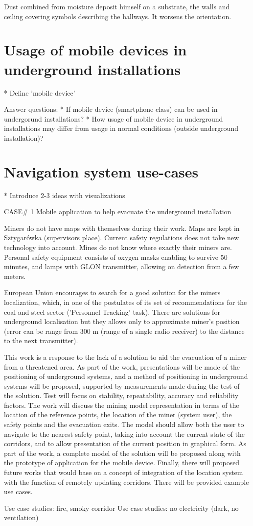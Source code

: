 \documentclass[../main.tex]{subfiles}
\begin{document}
Dust combined from moisture deposit himself on a substrate, the walls and ceiling covering symbols describing the hallways. It worsens the orientation.




\section{Usage of mobile devices in underground installations}
* Define 'mobile device'

Answer questions:
* If mobile device (smartphone class) can be used in undergorund installations?
* How usage of mobile device in underground installations may differ from usage in normal conditions (outside underground installation)?

\section{Navigation system use-cases}
* Introduce 2-3 ideas with visualizations

CASE# 1 Mobile application to help evacuate the underground installation

Miners do not have maps with themselves during their work. Maps are kept in Sztygarówka (supervisors place).
Current safety regulations does not take new technology into account. Mines do not know where exactly their miners are. Personal safety equipment consists of oxygen masks enabling to survive 50 minutes, and lamps with GLON transmitter, allowing on detection from a few meters.

European Union encourages to search for a good solution for the miners localization, which, in one of the postulates of its set of recommendations for the coal and steel sector ('Personnel Tracking' task). There are solutions for underground localisation but they allows only to approximate miner's position (error can be range from 300 m (range of a single radio receiver) to the distance to the next transmitter).

This work is a response to the lack of a solution to aid the evacuation of a miner from a threatened area. As part of the work, presentations will be made of the positioning of underground systems, and a method of positioning in underground systems will be proposed, supported by measurements made during the test of the solution. Test will focus on stability, repeatability, accuracy and reliability factors. The work will discuss the mining model representation in terms of the location of the reference points, the location of the miner (system user), the safety points and the evacuation exits. The model should allow both the user to navigate to the nearest safety point, taking into account the current state of the corridors, and to allow presentation of the current position in graphical form. As part of the work, a complete model of the solution will be proposed along with the prototype of application for the mobile device. Finally, there will proposed future works that would base on a concept of integration of the location system with the function of remotely updating corridors. There will be provided example use cases.

  Use case studies: fire, smoky corridor
  Use case studies: no electricity (dark, no ventilation)
\end{document}
